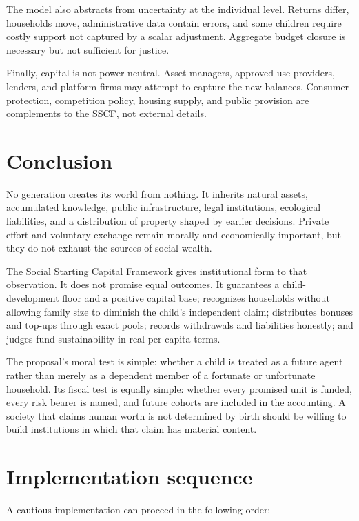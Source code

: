 \documentclass[11pt]{article}
\begin{document}
The model also abstracts from uncertainty at the individual level. Returns differ,
households move, administrative data contain errors, and some children require costly
support not captured by a scalar adjustment. Aggregate budget closure is necessary but
not sufficient for justice.

Finally, capital is not power-neutral. Asset managers, approved-use providers, lenders,
and platform firms may attempt to capture the new balances. Consumer protection,
competition policy, housing supply, and public provision are complements to the SSCF,
not external details.

\section{Conclusion}

No generation creates its world from nothing. It inherits natural assets, accumulated
knowledge, public infrastructure, legal institutions, ecological liabilities, and a
distribution of property shaped by earlier decisions. Private effort and voluntary
exchange remain morally and economically important, but they do not exhaust the sources
of social wealth.

The Social Starting Capital Framework gives institutional form to that observation. It
does not promise equal outcomes. It guarantees a child-development floor and a positive
capital base; recognizes households without allowing family size to diminish the
child's independent claim; distributes bonuses and top-ups through exact pools; records
withdrawals and liabilities honestly; and judges fund sustainability in real per-capita
terms.

The proposal's moral test is simple: whether a child is treated as a future agent rather
than merely as a dependent member of a fortunate or unfortunate household. Its fiscal
test is equally simple: whether every promised unit is funded, every risk bearer is
named, and future cohorts are included in the accounting. A society that claims human
worth is not determined by birth should be willing to build institutions in which that
claim has material content.

\appendix

\section{Implementation sequence}

A cautious implementation can proceed in the following order:
\end{document}
